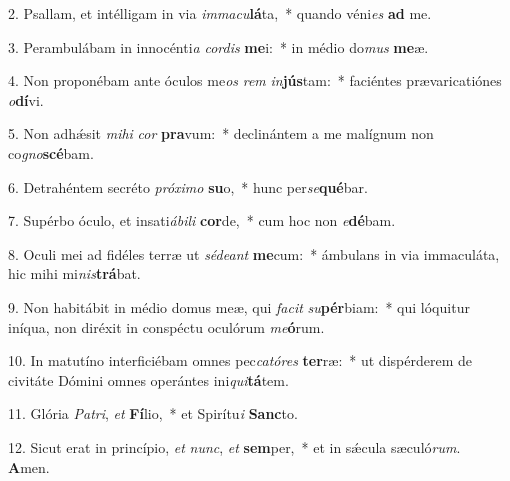 2. Psallam, et intélligam in via \textit{im}\textit{ma}\textit{cu}\textbf{lá}ta,~*  quando véni\textit{es} \textbf{ad} me.\

3. Perambulábam in innocénti\textit{a} \textit{cor}\textit{dis} \textbf{me}i:~*  in médio do\textit{mus} \textbf{me}æ.\

4. Non proponébam ante óculos me\textit{os} \textit{rem} \textit{in}\textbf{jús}tam:~*  faciéntes prævaricatiónes \textit{o}\textbf{dí}vi.\

5. Non adhǽsit \textit{mi}\textit{hi} \textit{cor} \textbf{pra}vum:~*  declinántem a me malígnum non co\textit{gno}\textbf{scé}bam.\

6. Detrahéntem secréto \textit{pró}\textit{xi}\textit{mo} \textbf{su}o,~*  hunc per\textit{se}\textbf{qué}bar.\

7. Supérbo óculo, et insati\textit{á}\textit{bi}\textit{li} \textbf{cor}de,~*  cum hoc non \textit{e}\textbf{dé}bam.\

8. Oculi mei ad fidéles terræ ut \textit{sé}\textit{de}\textit{ant} \textbf{me}cum:~*  ámbulans in via immaculáta, hic mihi mi\textit{nis}\textbf{trá}bat.\

9. Non habitábit in médio domus meæ, qui \textit{fa}\textit{cit} \textit{su}\textbf{pér}biam:~*  qui lóquitur iníqua, non diréxit in conspéctu oculórum \textit{me}\textbf{ó}rum.\

10. In matutíno interficiébam omnes pec\textit{ca}\textit{tó}\textit{res} \textbf{ter}ræ:~*  ut dispérderem de civitáte Dómini omnes operántes ini\textit{qui}\textbf{tá}tem.\

11. Glória \textit{Pa}\textit{tri}, \textit{et} \textbf{Fí}lio,~*  et Spirítu\textit{i} \textbf{Sanc}to.\

12. Sicut erat in princípio, \textit{et} \textit{nunc}, \textit{et} \textbf{sem}per,~*  et in sǽcula sæculó\textit{rum}. \textbf{A}men.\

